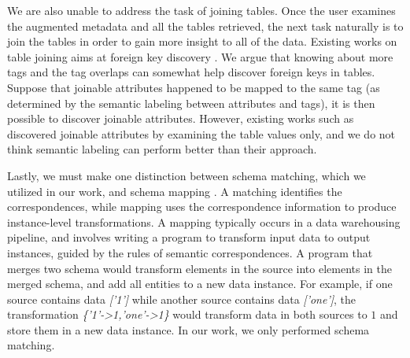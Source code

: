 We are also unable to address the task of joining tables. Once the user examines the augmented metadata and all the tables retrieved, the next task naturally is to join the tables in order to gain more insight to all of the data. Existing works on table joining aims at foreign key discovery \cite{Song2018GeoFlux}. We argue that knowing about more tags and the tag overlaps can somewhat help discover foreign keys in tables. Suppose that joinable attributes happened to be mapped to the same tag (as determined by the semantic labeling between attributes and tags), it is then possible to discover joinable attributes. However, existing works such as \cite{10.1145/3299869.3300065,10.14778/2994509.2994534} discovered joinable attributes by examining the table values only, and we do not think semantic labeling can perform better than their approach.

Lastly, we must make one distinction between schema matching, which we utilized in our work, and schema mapping \cite{Zhang2018Managing}. A matching identifies the correspondences, while mapping uses the correspondence information to produce instance-level transformations. A mapping typically occurs in a data warehousing pipeline, and involves writing a program to transform input data to output instances, guided by the rules of semantic correspondences. A program that merges two schema would transform elements in the source into elements in the merged schema, and add all entities to a new data instance. For example, if one source contains data \textit{['1']} while another source contains data \textit{['one']}, the transformation \textit{\{'1'-\textgreater 1,'one'-\textgreater 1\}} would transform data in both sources to $1$ and store them in a new data instance. In our work, we only performed schema matching.
\endinput